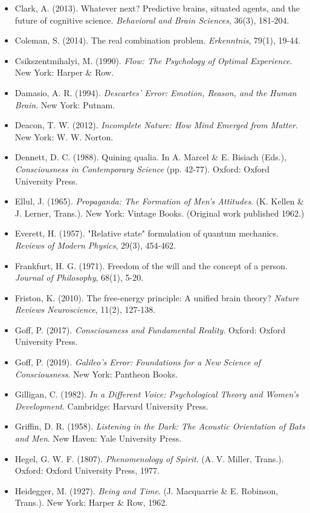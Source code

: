 \begin{itemize}[nosep,leftmargin=*]
  \item Clark, A. (2013). Whatever next? Predictive brains, situated agents, and the future of cognitive science. \textit{Behavioral and Brain Sciences}, 36(3), 181-204.
  \item Coleman, S. (2014). The real combination problem. \textit{Erkenntnis}, 79(1), 19-44.
  \item Csikszentmihalyi, M. (1990). \textit{Flow: The Psychology of Optimal Experience}. New York: Harper \& Row.
  \item Damasio, A. R. (1994). \textit{Descartes' Error: Emotion, Reason, and the Human Brain}. New York: Putnam.
  \item Deacon, T. W. (2012). \textit{Incomplete Nature: How Mind Emerged from Matter}. New York: W. W. Norton.
  \item Dennett, D. C. (1988). Quining qualia. In A. Marcel \& E. Bisiach (Eds.), \textit{Consciousness in Contemporary Science} (pp. 42-77). Oxford: Oxford University Press.
  \item Ellul, J. (1965). \textit{Propaganda: The Formation of Men's Attitudes}. (K. Kellen \& J. Lerner, Trans.). New York: Vintage Books. (Original work published 1962.)
  \item Everett, H. (1957). "Relative state" formulation of quantum mechanics. \textit{Reviews of Modern Physics}, 29(3), 454-462.
  \item Frankfurt, H. G. (1971). Freedom of the will and the concept of a person. \textit{Journal of Philosophy}, 68(1), 5-20.
  \item Friston, K. (2010). The free-energy principle: A unified brain theory? \textit{Nature Reviews Neuroscience}, 11(2), 127-138.
  \item Goff, P. (2017). \textit{Consciousness and Fundamental Reality}. Oxford: Oxford University Press.
  \item Goff, P. (2019). \textit{Galileo's Error: Foundations for a New Science of Consciousness}. New York: Pantheon Books.
  \item Gilligan, C. (1982). \textit{In a Different Voice: Psychological Theory and Women's Development}. Cambridge: Harvard University Press.
  \item Griffin, D. R. (1958). \textit{Listening in the Dark: The Acoustic Orientation of Bats and Men}. New Haven: Yale University Press.
  \item Hegel, G. W. F. (1807). \textit{Phenomenology of Spirit}. (A. V. Miller, Trans.). Oxford: Oxford University Press, 1977.
  \item Heidegger, M. (1927). \textit{Being and Time}. (J. Macquarrie \& E. Robinson, Trans.). New York: Harper \& Row, 1962.

\end{itemize}
